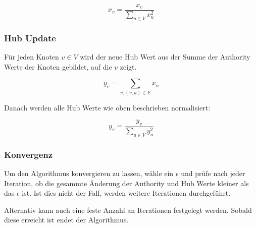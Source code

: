 \[ x_{v} =  \frac{x_{v}}{\sum_{u \in V} x_{u}^{2}} \]

\subsubsection{Hub Update}

Für jeden Knoten $ v \in V $ wird der neue Hub Wert aus der Summe der Authority Werte der Knoten gebildet, auf die $v$ zeigt.

\[ y_{v} = \sum_{v; (v, u) \in E} x_{u} \]

Danach werden alle Hub Werte wie oben beschrieben normalisiert:

\[ y_{v} =  \frac{y_{v}}{\sum_{u \in V} y_{u}^{2}} \]

\subsubsection{Konvergenz}

Um den Algorithmus konvergieren zu lassen, wähle ein $ \epsilon $ und prüfe nach jeder Iteration, ob die gesammte Änderung der Authority
und Hub Werte kleiner als das $ \epsilon $ ist. Ist dies nicht der Fall, werden weitere Iterationen durchgeführt.


Alternativ kann auch eine feste Anzahl an Iterationen festgelegt werden. Sobald diese erreicht ist endet der Algorithmus.
